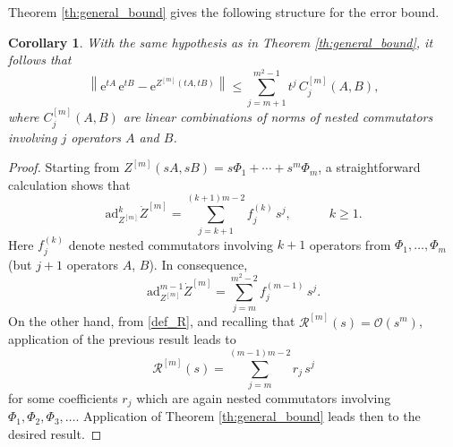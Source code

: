 \documentclass[11pt]{article}
\newcommand{\e}{\ensuremath{\mathrm{e}}}
\newcommand{\ad}{\ensuremath{\mathrm{ad}}}
\newtheorem{corollary}[theorem]{Corollary}
\begin{document}
Theorem \ref{th:general_bound} gives the following structure for the error bound.

\begin{corollary}
With the same hypothesis as in Theorem \ref{th:general_bound}, it follows that
\begin{equation} \label{bound_pol}
   \left\| \e^{t A} \, \e^{t B} - \e^{Z^{[m]}(tA, tB) } \right\| \le \sum_{j=m+1}^{m^2 -1} t^j \, C_j^{[m]}(A,B),
\end{equation}
where $C_j^{[m]}(A,B)$ are linear combinations of norms of nested commutators involving $j$ operators $A$ and $B$.
\end{corollary}

\begin{proof}
Starting from  $Z^{[m]}(sA,sB) = s \Phi_1 + \cdots + s^m \Phi_m$, a straightforward calculation shows that
\[
  \ad_{Z^{[m]}}^{k} \dot{Z}^{[m]} = \sum_{j = k+1}^{(k+1)m-2} f_j^{(k)} \, s^j, \qquad\quad k \ge 1.
\]
Here $f_j^{(k)}$ denote nested commutators involving $k+1$ operators from $\Phi_1, \ldots, \Phi_m$ (but $j+1$ operators
$A$, $B$). In consequence,
\begin{equation} \label{exp_Zm}
  \ad_{Z^{[m]}}^{m-1} \dot{Z}^{[m]} = \sum_{j = m}^{m^2-2} f_j^{(m-1)} \, s^j.
\end{equation}
On the other hand, from \eqref{def_R}, and recalling that $ \mathcal{R}^{[m]}(s) = \mathcal{O}(s^m)$, application of the previous
result leads to
\begin{equation} \label{exp_R}
   \mathcal{R}^{[m]}(s) = \sum_{j=m}^{(m-1)m -2} r_j \, s^j 
\end{equation}
for some coefficients $r_j$ which are again nested commutators involving $\Phi_1, \Phi_2, \Phi_3, \ldots$. 
Application of  Theorem \ref{th:general_bound} leads then to the
desired result.
\end{proof} 
\end{document}
